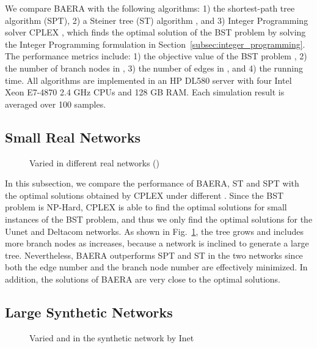 \documentclass[conference]{IEEEtran}
\begin{document}
We compare BAERA with the following algorithms: 1) the shortest-path tree
algorithm (SPT), 2) a Steiner tree (ST) algorithm \cite{Takahashi1980}, and 3)
Integer Programming solver CPLEX \cite{cplexwebsite}, which finds the
optimal solution of the BST problem by solving the Integer Programming
formulation in Section~\ref{subsec:integer_programming}. The performance
metrics include: 1) the objective value of the BST problem , 2)
the number of branch nodes in , 3) the number of edges in , and 4) the
running time. All algorithms are implemented in an HP DL580 server with four
Intel Xeon E7-4870 2.4 GHz CPUs and 128 GB RAM. Each simulation result is
averaged over 100 samples.

\subsection{Small Real Networks}

\begin{figure}[t]
 
\caption{Varied  in different real networks ()}
\label{fig:comparing_with_cplex}
\end{figure}

In this subsection, we compare the performance of BAERA, ST and SPT with the
optimal solutions obtained by CPLEX under different . Since the BST
problem is NP-Hard, CPLEX is able to find the optimal solutions for small
instances of the BST problem, and thus we only find the optimal solutions
for the Uunet and Deltacom networks. As shown in Fig.~\ref {fig:comparing_with_cplex}, the tree  grows and includes more branch
nodes as  increases, because a network is inclined to generate a large
tree. Nevertheless, BAERA outperforms SPT and ST in the two networks since
both the edge number and the branch node number are effectively minimized.
 In addition, the solutions of BAERA are very close to the optimal solutions.

\subsection{Large Synthetic Networks}

\begin{figure}[t]
  \newline
{}  \newline
{} 
\caption{Varied  and  in the synthetic network by Inet}
\label{fig:synthetic_w_k}
\end{figure}
\end{document}
